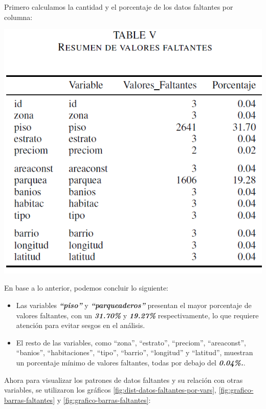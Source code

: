 \documentclass[conference,final,]{IEEEtran}
\begin{document}
Primero calculamos la cantidad y el porcentaje de los datos faltantes
por columna:

\includegraphics[width=0.9\linewidth]{images/Tabla5}

En base a lo anterior, podemos concluir lo siguiente:

\begin{itemize}
\item
  Las variables \textbf{\emph{``piso''}} y
  \textbf{\emph{``parqueaderos''}} presentan el mayor porcentaje de
  valores faltantes, con un \textbf{\emph{31.70\%}} y
  \textbf{\emph{19.27\%}} respectivamente, lo que requiere atención para
  evitar sesgos en el análisis.
\item
  El resto de las variables, como ``zona'', ``estrato'', ``preciom'',
  ``areaconst'', ``banios'', ``habitaciones'', ``tipo'', ``barrio'',
  ``longitud'' y ``latitud'', muestran un porcentaje mínimo de valores
  faltantes, todas por debajo del \textbf{\emph{0.04\%.}}.
\end{itemize}

Ahora para visualizar los patrones de datos faltantes y su relación con
otras variables, se utilizaron los gráficos
\ref{fig:dist-datos-faltantes-por-vars},
\ref{fig:grafico-barras-faltantes} y \ref{fig:grafico-barras-faltantes}:
\end{document}
